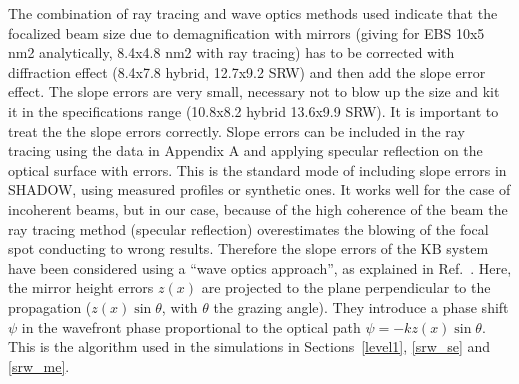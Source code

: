 \documentclass{iucr}              %
\begin{document}
The combination of ray tracing and wave optics methods used indicate that the focalized beam size due to  demagnification with mirrors (giving for EBS 10x5 nm2 analytically, 8.4x4.8 nm2 with ray tracing) has to be corrected with diffraction effect (8.4x7.8 hybrid, 12.7x9.2 SRW) and then add the slope error effect. The slope errors are very small, necessary not to blow up the size and kit it in the specifications range (10.8x8.2 hybrid 13.6x9.9 SRW). It is important to treat the the slope errors correctly. Slope errors can be included in the ray tracing using the data in Appendix A and applying specular reflection on the optical surface with errors. This is the standard mode of including slope errors in SHADOW, using measured profiles or synthetic ones. It works well for the case of incoherent beams, but in our case, because of the high coherence of the beam the ray tracing method (specular reflection) overestimates the blowing of the focal spot conducting to wrong results. Therefore the slope errors of the KB system have been considered using a ``wave optics approach'', as explained in Ref.~\cite{hybrid}. Here, the mirror height errors $z(x)$ are projected to the plane perpendicular to the propagation ($z(x) \sin \theta$, with $\theta$ the grazing angle). They introduce a phase shift $\psi$ in the wavefront phase proportional to the optical path $\psi = - k z(x) \sin \theta $. This is the algorithm used in the simulations in Sections~\ref{level1}, \ref{srw_se} and \ref{srw_me}.   


\end{document}
